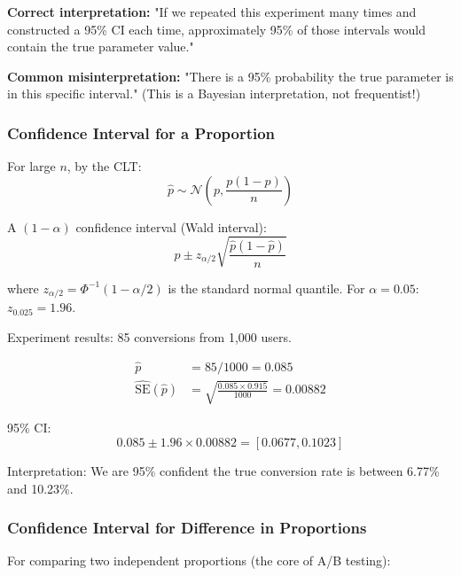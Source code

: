 \textbf{Correct interpretation:} "If we repeated this experiment many times and constructed a 95\% CI each time, approximately 95\% of those intervals would contain the true parameter value."

\textbf{Common misinterpretation:} "There is a 95\% probability the true parameter is in this specific interval." (This is a Bayesian interpretation, not frequentist!)

\subsubsection{Confidence Interval for a Proportion}

For large $n$, by the CLT:
\begin{equation}
\hat{p} \sim \mathcal{N}\left(p, \frac{p(1-p)}{n}\right)
\end{equation}

A $(1-\alpha)$ confidence interval (Wald interval):
\begin{equation}
\hat{p} \pm z_{\alpha/2} \sqrt{\frac{\hat{p}(1-\hat{p})}{n}}
\end{equation}

where $z_{\alpha/2} = \Phi^{-1}(1-\alpha/2)$ is the standard normal quantile. For $\alpha = 0.05$: $z_{0.025} = 1.96$.

\begin{example}
Experiment results: 85 conversions from 1,000 users.

\begin{align}
\hat{p} &= 85/1000 = 0.085 \\
\widehat{\text{SE}}(\hat{p}) &= \sqrt{\frac{0.085 \times 0.915}{1000}} = 0.00882
\end{align}

95\% CI:
\begin{equation}
0.085 \pm 1.96 \times 0.00882 = [0.0677, 0.1023]
\end{equation}

Interpretation: We are 95\% confident the true conversion rate is between 6.77\% and 10.23\%.
\end{example}

\subsubsection{Confidence Interval for Difference in Proportions}

For comparing two independent proportions (the core of A/B testing):

